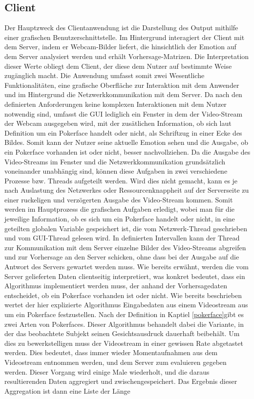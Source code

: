 \documentclass[12pt, a4paper]{report}
\begin{document}
\subsection{Client}
Der Hauptzweck des Clientanwendung ist die Darstellung des Output mithilfe einer grafischen Benutzerschnittstelle. Im Hintergrund interagiert der Client mit dem Server, indem er Webcam-Bilder liefert, die hinsichtlich der Emotion auf dem Server analysiert werden und erhält Vorhersage-Matrizen. Die Interpretation dieser Werte obliegt dem Client, der diese dem Nutzer auf bestimmte Weise zugänglich macht. Die Anwendung umfasst somit zwei Wesentliche Funktionalitäten, eine grafische Oberfläche zur Interaktion mit dem Anwender und im Hintergrund die Netzwerkkommunikation mit dem Server. Da nach den definierten Anforderungen keine komplexen Interaktionen mit dem Nutzer notwendig sind, umfasst die GUI lediglich ein Fenster in dem der Video-Stream der Webcam ausgegeben wird, mit der zusätlichen Information, ob sich laut Definition um ein Pokerface handelt oder nicht, als Schriftzug in einer Ecke des Bildes. Somit kann der Nutzer seine aktuelle Emotion sehen und die Ausgabe, ob ein Pokerface vorhanden ist oder nicht, besser nachvollziehen. Da die Ausgabe des Video-Streams im Fenster und die Netzwerkkommunikation grundsätzlich voneinander unabhängig sind, können diese Aufgaben in zwei verschiedene Prozesse bzw. Threads aufgeteilt werden. Wird dies nicht gemacht, kann es je nach Auslastung des Netzwerkes oder Ressourcenknappheit auf der Serverseite zu einer ruckeligen und verzögerten Ausgabe des Video-Stream kommen. Somit werden im Hauptprozess die grafischen Aufgaben erledigt, wobei man für die jeweilige Information, ob es sich um ein Pokerface handelt oder nicht, in eine geteilten globalen Variable gespeichert ist, die vom Netzwerk-Thread geschrieben und vom GUI-Thread gelesen wird. In definierten Intervallen kann der Thread zur Kommunikation mit dem Server einzelne Bilder des Video-Streams abgreifen und zur Vorhersage an den Server schicken, ohne dass bei der Ausgabe auf die Antwort des Servers gewartet werden muss. Wie bereits erwähnt, werden die vom Server gelieferten Daten clientseitig interpretiert, was konkret bedeutet, dass ein Algorithmus implementiert werden muss, der anhand der Vorhersagedaten entscheidet, ob ein Pokerface vorhanden ist oder nicht. \newline
Wie bereits beschrieben wertet der hier explizierte Algorithmus Eingabedaten aus einem Videostream aus um ein Pokerface festzustellen. Nach der Definition in Kaptiel 
\ref{pokerface}gibt es zwei Arten von Pokerfaces. Dieser Algorithmus behandelt dabei die Variante, in der das beobachtete Subjekt seinen Gesichtsausdruck dauerhaft beibehält. Um dies zu bewerkstelligen muss der Videostream in einer gewissen Rate abgetastet werden. Dies bedeutet, dass immer wieder Momentaufnahmen aus dem Videostream entnommen werden, und dem Server zum evaluieren gegeben werden. Dieser Vorgang wird einige Male wiederholt, und die daraus resultierenden Daten aggregiert und zwischengespeichert. Das Ergebnis dieser Aggregation ist dann eine Liste der Länge
\end{document}

